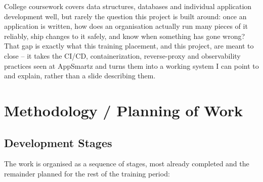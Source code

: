 \documentclass[12pt,a4paper]{article}
\begin{document}
College coursework covers data structures,
databases and individual application development well, but rarely the
question this project is built around: once an application is written, how
does an organisation actually run many pieces of it reliably, ship changes to
it safely, and know when something has gone wrong? That gap is exactly what
this training placement, and this project, are meant to close -- it takes the
CI/CD, containerization, reverse-proxy and observability practices seen at
AppSmartz and turns them into a working system I can point to and explain,
rather than a slide describing them.

\clearpage
\section{Methodology / Planning of Work}

\subsection{Development Stages}

The work is organised as a sequence of stages, most already completed and the
remainder planned for the rest of the training period:
\end{document}
